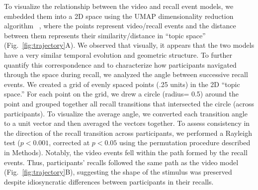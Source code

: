 

To visualize the relationship between the video and recall event models, we embedded them into a 2D space using the UMAP dimensionality reduction algorithm ~\citep{McInHeal18}, where the points represent video/recall events and the distance between them represents their similarity/distance in ``topic space'' (Fig.~\ref{fig:trajectory}A).  We observed that visually, it appears that the two models have a very similar temporal evolution and geometric structure. To further quantify this correspondence and to characterize how participants navigated through the space during recall, we analyzed the angle between successive recall events. We created a grid of evenly spaced points (.25 units) in the 2D ``topic space.'' For each point on the grid, we drew a circle (radius= 0.5) around the point and grouped together all recall transitions that intersected the circle (across participants). To visualize the average angle, we converted each transition angle to a unit vector and then averaged the vectors together. To assess consistency in the direction of the recall transition across participants, we performed a Rayleigh test ($p < 0.001$, corrected at $p < 0.05$ using the permutation procedure described in Methods). Notably, the video events fell within the path formed by the recall events.  Thus, participants' recalls followed the same path as the video model (Fig.~\ref{fig:trajectory}B), suggesting the shape of the stimulus was preserved despite idiosyncratic differences between participants in their recalls.









